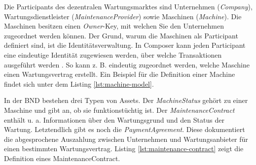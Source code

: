 Die Participants des dezentralen Wartungsmarktes sind Unternehmen (\textit{Company}), Wartungsdienstleister (\textit{MaintenanceProvider}) sowie Maschinen (\textit{Machine}). Die Maschinen besitzen einen \textit{Owner}-Key, mit welchen Sie den Unternehmen zugeordnet werden können. Der Grund, warum die Maschinen als Participant definiert sind, ist die Identitätsverwaltung. In Composer kann jeden Participant eine eindeutige Identität zugewiesen werden, über welche Transaktionen ausgeführt werden \cite{HyperledgerComposerTeamParticipantsidentitiesHyperledger}. So kann z. B. eindeutig zugeordnet werden, welche Maschine einen Wartungsvertrag erstellt. Ein Beispiel für die Definition einer Machine findet sich unter dem Listing \ref{lst:machine-model}.


In der \acs{BND} bestehen drei Typen von Assets. Der \textit{MachineStatus} gehört zu einer Maschine und gibt an, ob sie funktionstüchtig ist. Der \textit{MaintenanceContract} enthält u. a. Informationen über den Wartungsgrund und den Status der Wartung. Letztendlich gibt es noch die \textit{PaymentAgreement}. Diese dokumentiert die abgesprochene Auszahlung zwischen Unternehmen und Wartungsanbieter für einen bestimmten Wartungsvertrag. Listing \ref{lst:maintenance-contract} zeigt die Definition eines MaintenanceContract.


